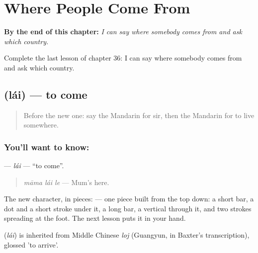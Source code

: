 
\chapter{Where People Come From}
\label{ch:zh-where-people-come-from}

\begin{chapteropening}
\textbf{By the end of this chapter:} \emph{I can say where somebody comes from and ask which country.}

Complete the last lesson of chapter 36: I can say where somebody comes from and ask which country.
\end{chapteropening}

\section[\texorpdfstring{\zh{来} (lái)}{来 (lái)}]{ (lái) — to come}

\label{lesson:ZH-C36-lai}



\begin{quote}
Before the new one: say the Mandarin for sir, then the Mandarin for to live somewhere.
\end{quote}

\subsection*{You'll want to know: }
\textbf{} — \emph{lái} — \textquotedblleft{}to come\textquotedblright{}.

\begin{quote}
\textbf{} \emph{māma lái le} — Mum's here.
\end{quote}

The new character, in pieces:  — one piece built from the top down: a short bar, a dot and a short stroke under it, a long bar, a vertical through it, and two strokes spreading at the foot. The next lesson puts it in your hand.

\begin{cousinweb}
\textbf{} (\emph{lái}) is inherited from Middle Chinese \emph{loj} (Guangyun, in Baxter's transcription), glossed 'to arrive'.
\end{cousinweb}

